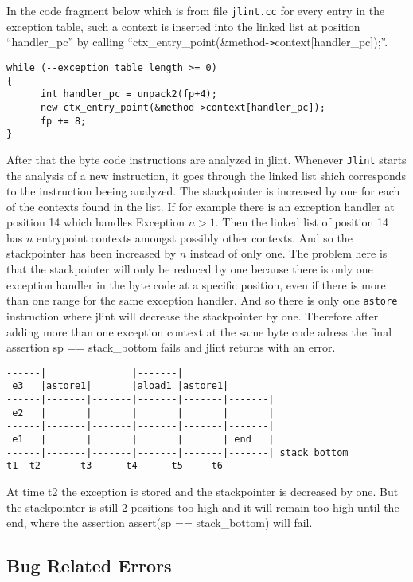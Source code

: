 \documentclass[11pt,twoside,a4paper,draft]{article}
\begin{document}
In the code fragment below which is from file \texttt{jlint.cc} for 
every entry in the exception table, such a context is inserted into the linked
list at position ``handler\_pc'' by calling ``ctx\_entry\_point(\&method-\verb+>+context[handler\_pc]);''.
\begin{verbatim}
while (--exception_table_length >= 0)
{ 
      int handler_pc = unpack2(fp+4);
      new ctx_entry_point(&method->context[handler_pc]); 
      fp += 8;
}
\end{verbatim}
After that the byte code instructions are analyzed in jlint. Whenever 
\texttt{Jlint} starts the analysis of a new instruction, it goes through the
linked list shich corresponds to the instruction beeing analyzed. The 
stackpointer is increased by one for each of the contexts found in the list.
If for example there is an exception handler at position 14 which handles
Exception $n > 1$. Then the linked list of position 14 has $n$ entrypoint
contexts amongst possibly other contexts. And so the stackpointer has been
increased by $n$ instead of only one. The problem here is that the stackpointer
will only be reduced by one because there is only one exception 
handler in the byte code at a specific position, even if there is more than 
one range for the same exception handler. And so there is only one 
\texttt{astore} instruction
where jlint will decrease the stackpointer by one. Therefore after adding more
than one exception context at the same byte code adress the final assertion
sp == stack\_bottom fails and jlint returns with an error.

\begin{verbatim}
------|               |-------|
 e3   |astore1|       |aload1 |astore1|
------|-------|-------|-------|-------|-------|
 e2   |       |       |       |       |       |
------|-------|-------|-------|-------|-------|
 e1   |       |       |       |       | end   |
------|-------|-------|-------|-------|-------| stack_bottom
t1	t2       t3      t4      t5     t6
\end{verbatim}


At time t2 the exception is stored and the stackpointer is decreased by one.
But the stackpointer is still 2 positions too high and it will remain too high
until the end, where the assertion assert(sp == stack\_bottom) will fail.

\subsection {Bug Related Errors}
\end{document}

